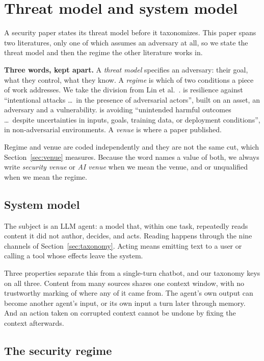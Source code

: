 \section{Threat model and system model} \label{sec:threat}

A security paper states its threat model before it taxonomizes. This paper
spans two literatures, only one of which assumes an adversary at all, so we
state the threat model and then the regime the other literature works in.

\textbf{Three words, kept apart.} A \emph{threat model} specifies an
adversary: their goal, what they control, what they know. A \emph{regime} is
which of two conditions a piece of work addresses. We take the division from
Lin et al.~\cite{lin-2025-safety-security}.  is resilience
against ``intentional attacks \ldots\ in the presence of adversarial
actors'', built on an asset, an adversary and a vulnerability. 
is avoiding ``unintended harmful outcomes \ldots\ despite uncertainties in
inputs, goals, training data, or deployment conditions'', in non-adversarial
environments. A \emph{venue} is where a paper published.

Regime and venue are coded independently and they are not the same cut, which
Section~\ref{sec:venue} measures. Because the word  names a
value of both, we always write \emph{security venue} or \emph{AI venue} when
we mean the venue, and  or  unqualified when we
mean the regime.

\subsection{System model}

The subject is an LLM agent: a model that, within one task, repeatedly reads
content it did not author, decides, and acts. Reading happens through the nine
channels of Section~\ref{sec:taxonomy}. Acting means emitting text to a user
or calling a tool whose effects leave the system.

Three properties separate this from a single-turn chatbot, and our taxonomy
keys on all three. Content from many sources shares one context window, with
no trustworthy marking of where any of it came from. The agent's own output
can become another agent's input, or its own input a turn later through
memory. And an action taken on corrupted context cannot be undone by fixing
the context afterwards.

\subsection{The security regime}

